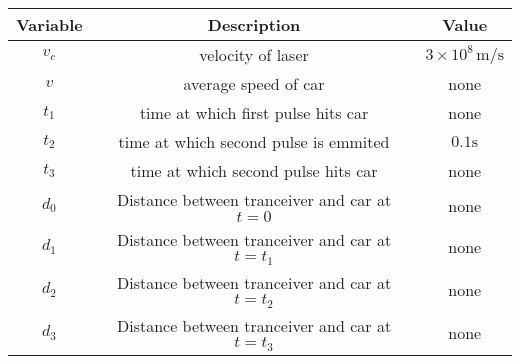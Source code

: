 \begin{tabular}{|c|c|c|}
    \hline
    \textbf{Variable} & \textbf{Description} & \textbf{Value} \\
    \hline
    $v_c$ & velocity of laser & $3 \times 10^{8} \, \text{m/s}$ \\
    \hline
    $v$ & average speed of car & none \\
    \hline
    $t_1$ & time at which first pulse hits car & none \\
    \hline
     $t_2$ & time at which second pulse is emmited & $0.1\text{s}$ \\
    \hline
     $t_3$ & time at which  second pulse hits car & none \\
    \hline
    $d_0$ & Distance between tranceiver and car at $t=0$ & none \\
    \hline
    $d_1$ & Distance between tranceiver and car at $t=t_1$ & none \\
    \hline
    $d_2$ & Distance between tranceiver and car at $t=t_2$ & none \\
    \hline
    $d_3$ & Distance between tranceiver and car at $t=t_3$ & none \\
    \hline
  \end{tabular}

